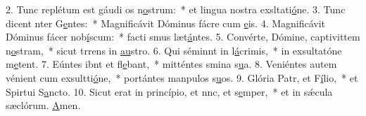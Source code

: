 2. Tunc replétum est gáudi os n\uline{o}strum:~* et lingua nostra exsltati\uline{ó}ne.
3. Tunc dicent nter G\uline{e}ntes:~* Magnificávit Dóminus fácre cum \uline{e}is.
4. Magnificávit Dóminus fácer nob\uline{í}scum:~* facti smus læt\uline{á}ntes.
5. Convérte, Dómine, captivittem n\uline{o}stram,~* sicut trrens in \uline{au}stro.
6. Qui séminnt in l\uline{á}crimis,~* in exsultatóne m\uline{e}tent.
7. Eúntes ibnt et fl\uline{e}bant,~* mitténtes smina s\uline{u}a.
8. Veniéntes autem vénient cum exsultti\uline{ó}ne,~* portántes manpulos s\uline{u}os.
9. Glória Patr, et F\uline{í}lio,~* et Spirtui S\uline{a}ncto.
10. Sicut erat in princípio, et nnc, et s\uline{e}mper,~* et in sǽcula sæclórum. \uline{A}men.
